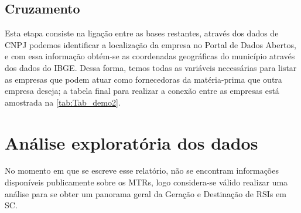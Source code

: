 \subsection{Cruzamento}

Esta etapa consiste na ligação entre as bases restantes, através dos dados de \gls{CNPJ} podemos identificar a localização da empresa no Portal de Dados Abertos, e com essa informação obtém-se as coordenadas geográficas do município através dos dados do \gls{IBGE}. Dessa forma, temos todas as variáveis necessárias para listar as empresas que podem atuar como fornecedoras da matéria-prima que outra empresa deseja; a tabela final para realizar a conexão entre as empresas está amostrada na \autoref{tab:Tab_demo2}.

\begin{table}[htb]
    \ABNTEXfontereduzida
    \centering
    \caption{Amostra da estrutura de dados pós cruzamento. \label{tab:Tab_demo2} }
\end{table}


\section{Análise exploratória dos dados}

No momento em que se escreve esse relatório, não se encontram informações disponíveis publicamente sobre os \gls{MTR}s, logo considera-se válido realizar uma análise para se obter um panorama geral da Geração e Destinação de \gls{RSI}s em \gls{SC}. 

